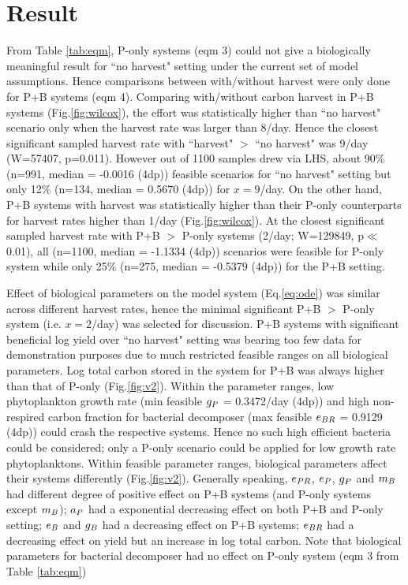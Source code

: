 \documentclass[../thesis.tex]{subfiles} %
\begin{document}
\section{Result}
From Table \ref{tab:eqm}, P-only systems (eqm 3) could not give a biologically meaningful result for ``no harvest" setting under the current set of model assumptions.  Hence comparisons between with/without harvest were only done for P+B systems (eqm 4).  Comparing with/without carbon harvest in P+B systems (Fig.\ref{fig:wilcox}), the effort was statistically higher than ``no harvest" scenario only when the harvest rate was larger than 8/day.  Hence the closest significant sampled harvest rate with ``harvest" $>$ ``no harvest" was 9/day (W=57407, p=0.011).  However out of 1100 samples drew via LHS, about 90\% (n=991, median = -0.0016 (4dp)) feasible scenarios for ``no harvest" setting but only 12\% (n=134, median = 0.5670 (4dp)) for $x=9$/day.  On the other hand, P+B systems with harvest was statistically higher than their P-only counterparts for harvest rates higher than 1/day (Fig.\ref{fig:wilcox}).  At the closest significant sampled harvest rate with P+B $>$ P-only systems (2/day; W=129849, p$\ll$0.01), all (n=1100, median = -1.1334 (4dp)) scenarios were feasible for P-only system while only 25\% (n=275, median = -0.5379 (4dp)) for the P+B setting.

Effect of biological parameters on the model system (Eq.\ref{eq:ode}) was similar across different harvest rates, hence the minimal significant P+B $>$ P-only system (i.e. $x=2$/day) was selected for discussion.  P+B systems with significant beneficial log yield over ``no harvest" setting was bearing too few data for demonstration purposes due to much restricted feasible ranges on all biological parameters.  Log total carbon stored in the system for P+B was always higher than that of P-only (Fig.\ref{fig:v2}).  Within the parameter ranges, low phytoplankton growth rate (min feasible $g_P$ = 0.3472/day (4dp)) and high non-respired carbon fraction for bacterial decomposer (max feasible $e_{BR}$ = 0.9129 (4dp)) could crash the respective systems.  Hence no such high efficient bacteria could be considered; only a P-only scenario could be applied for low growth rate phytoplanktons.  Within feasible parameter ranges, biological parameters affect their systems differently (Fig.\ref{fig:v2}).  Generally speaking, $e_{PR}$, $e_P$, $g_P$ and $m_B$ had different degree of positive effect on P+B systems (and P-only systems except $m_B$); $a_P$ had a exponential decreasing effect on both P+B and P-only setting; $e_B$ and $g_B$ had a decreasing effect on P+B systems; $e_{BR}$ had a decreasing effect on yield but an increase in log total carbon.  Note that biological parameters for bacterial decomposer had no effect on P-only system (eqm 3 from Table \ref{tab:eqm})
\end{document}
